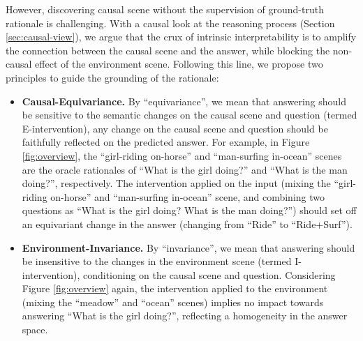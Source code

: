 %
However, discovering causal scene without the supervision of ground-truth rationale is challenging.
With a causal look at the reasoning process (\cf Section \ref{sec:causal-view}), we argue that the crux of intrinsic interpretability is to amplify the connection between the causal scene and the answer, while blocking the non-causal effect of the environment scene.
Following this line, we propose two principles to guide the grounding of the rationale:
\begin{itemize}[leftmargin=*]
    \item \textbf{Causal-Equivariance.}
    By ``equivariance'', we mean that answering should be sensitive to the semantic changes on the causal scene and question (termed E-intervention), \eg any change on the causal scene and question should be faithfully reflected on the predicted answer. For example, in Figure \ref{fig:overview}, the ``girl-riding on-horse'' and ``man-surfing in-ocean'' scenes are the oracle rationales of ``What is the girl doing?'' and ``What is the man doing?'', respectively. The intervention applied on the input (\ie mixing the ``girl-riding on-horse'' and ``man-surfing in-ocean'' scene, and combining two questions as ``What is the girl doing? What is the man doing?'') should set off an equivariant change in the answer (\ie changing from ``Ride'' to ``Ride+Surf'').
    
    
    
    \item \textbf{Environment-Invariance.}
    By ``invariance'', we mean that answering should be insensitive to the changes in the environment scene (termed I-intervention), conditioning on the causal scene and question.
    Considering Figure \ref{fig:overview} again, the intervention applied to the environment (\ie mixing the ``meadow'' and ``ocean'' scenes) implies no impact towards answering ``What is the girl doing?'', reflecting a homogeneity in the answer space.
\end{itemize}



